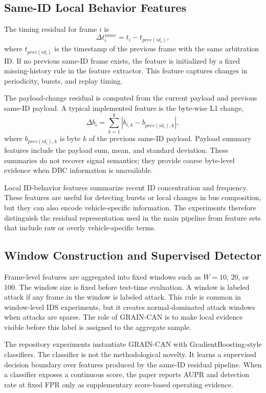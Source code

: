 \documentclass[runningheads]{llncs}
\newcommand{\method}{GRAIN-CAN}
\begin{document}
\subsection{Same-ID Local Behavior Features}
The timing residual for frame \(i\) is
\begin{equation}
  \Delta t^{same}_i = t_i - t_{prev(id_i)},
\end{equation}
where \(t_{prev(id_i)}\) is the timestamp of the previous frame with the same arbitration ID. If no previous same-ID frame exists, the feature is initialized by a fixed missing-history rule in the feature extractor. This feature captures changes in periodicity, bursts, and replay timing.

The payload-change residual is computed from the current payload and previous same-ID payload. A typical implemented feature is the byte-wise L1 change,
\begin{equation}
  \Delta b_i = \sum_{k=1}^{8} |b_{i,k} - b_{prev(id_i),k}|,
\end{equation}
where \(b_{prev(id_i),k}\) is byte \(k\) of the previous same-ID payload. Payload summary features include the payload sum, mean, and standard deviation. These summaries do not recover signal semantics; they provide coarse byte-level evidence when DBC information is unavailable.

Local ID-behavior features summarize recent ID concentration and frequency. These features are useful for detecting bursts or local changes in bus composition, but they can also encode vehicle-specific information. The experiments therefore distinguish the residual representation used in the main pipeline from feature sets that include raw or overly vehicle-specific terms.

\subsection{Window Construction and Supervised Detector}
Frame-level features are aggregated into fixed windows such as \(W=10\), \(20\), or \(100\). The window size is fixed before test-time evaluation. A window is labeled attack if any frame in the window is labeled attack. This rule is common in window-level IDS experiments, but it creates normal-dominated attack windows when attacks are sparse. The role of \method{} is to make local evidence visible before this label is assigned to the aggregate sample.

The repository experiments instantiate \method{} with GradientBoosting-style classifiers. The classifier is not the methodological novelty. It learns a supervised decision boundary over features produced by the same-ID residual pipeline. When a classifier exposes a continuous score, the paper reports AUPR and detection rate at fixed FPR only as supplementary score-based operating evidence.
\end{document}
